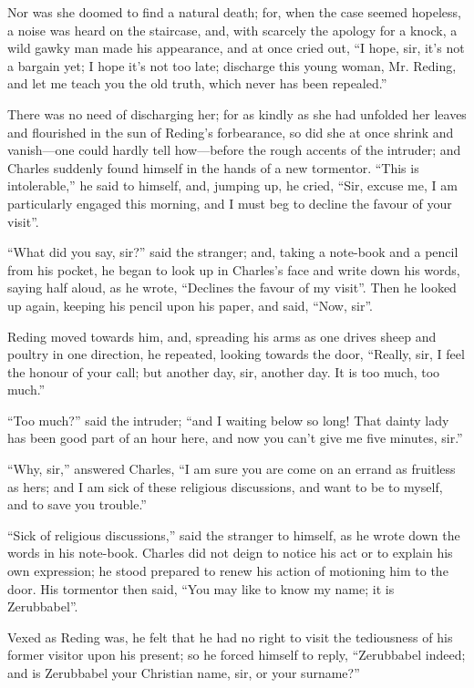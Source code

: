 Nor was she doomed to find a natural death; for, when the case
seemed hopeless, a noise was heard on the staircase, and, with
scarcely the apology for a knock, a wild gawky man made his
appearance, and at once cried out, ``I hope, sir, it's not a
bargain yet; I hope it's not too late; discharge this young woman, Mr.
Reding, and let me teach you the old truth, which never has been
repealed.''

There was no need of discharging her; for as kindly as she had
unfolded her leaves and flourished in the sun of Reding's forbearance,
so did she at once shrink and vanish—one could hardly tell how—before
the rough accents of the intruder; and Charles suddenly found himself
in the hands of a new tormentor. ``This is intolerable,'' he
said to himself, and, jumping up, he cried, ``Sir, excuse me, I am
particularly engaged this morning, and I must beg to decline the
favour of your visit''.

``What did you say, sir?'' said the stranger; and, taking a
note-book and a pencil from his pocket, he began to look up in Charles's
face and write down his words, saying half aloud, as he wrote,
``Declines the favour of my visit''. Then he looked up again,
keeping his pencil upon his paper, and said, ``Now, sir''.

Reding moved towards him, and, spreading his arms as one drives
sheep and poultry in one direction, he repeated, looking towards the
door, ``Really, sir, I feel the honour of your call; but
another day, sir, another day. It is too much, too much.''

``Too much?'' said the intruder; ``and I waiting below
so long! That dainty lady has been good part of an hour here, and now
you can't give me five minutes, sir.''

``Why, sir,'' answered Charles, ``I am sure you are
come on an errand as fruitless as hers; and I am sick of these
religious discussions, and want to be to myself, and to save you
trouble.''

``Sick of religious discussions,'' said the stranger to
himself, as he wrote down the words in his note-book. Charles did not
deign to notice his act or to explain his own expression; he stood
prepared to renew his action of motioning him to the door. His
tormentor then said, ``You may like to know my name; it is
Zerubbabel''.

Vexed as Reding was, he felt that he had no right to visit the
tediousness of his former visitor upon his present; so he forced
himself to reply, ``Zerubbabel indeed; and is Zerubbabel your
Christian name, sir, or your surname?''

